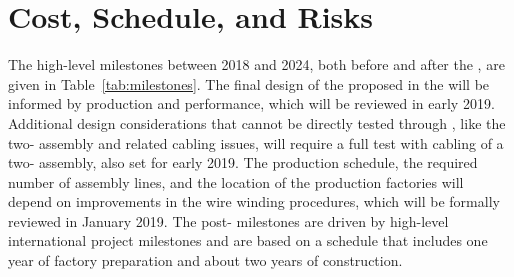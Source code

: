 \section{Cost, Schedule, and Risks}
\label{sec:fdsp-apa-cost-sched}



The high-level milestones between 2018 and 2024, both before and after the , are given in Table~\ref{tab:milestones}. The final design of the  proposed in the  will be informed by   production and performance, which will be reviewed in early 2019. Additional design considerations that cannot be directly tested through , like the two- assembly and related cabling issues, will require a full test with cabling of a two- assembly, also set for early 2019. The production schedule, the required number of assembly lines, and the location of the production factories will depend on improvements in the wire winding procedures, which will be formally reviewed in January 2019. The post- milestones are driven by high-level international project milestones and are based on a schedule that includes one year of factory preparation and about two years of  construction.

